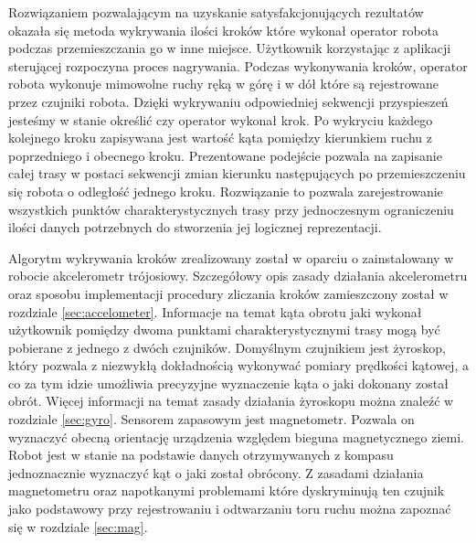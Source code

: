 Rozwiązaniem pozwalającym na uzyskanie satysfakcjonujących rezultatów okazała
się metoda wykrywania ilości kroków które wykonał operator robota podczas 
przemieszczania go w inne miejsce. Użytkownik korzystając z aplikacji
sterującej rozpoczyna proces nagrywania. Podczas wykonywania kroków, operator 
robota wykonuje mimowolne ruchy ręką w górę i w dół które są rejestrowane przez
czujniki robota. Dzięki wykrywaniu odpowiedniej sekwencji przyspieszeń jesteśmy
w stanie określić czy operator wykonał krok. Po wykryciu każdego kolejnego kroku
zapisywana jest wartość kąta pomiędzy kierunkiem ruchu z poprzedniego i obecnego
kroku. Prezentowane podejście pozwala na zapisanie całej trasy w postaci
sekwencji zmian kierunku następujących po przemieszczeniu się robota o odległość
jednego kroku. Rozwiązanie to pozwala zarejestrowanie wszystkich punktów
charakterystycznych trasy przy jednoczesnym ograniczeniu ilości danych
potrzebnych do stworzenia jej logicznej reprezentacji.

Algorytm wykrywania kroków zrealizowany został w oparciu o zainstalowany w
robocie akcelerometr trójosiowy. Szczegółowy opis zasady działania
akcelerometru oraz sposobu implementacji procedury zliczania kroków zamieszczony
został w rozdziale \ref{sec:accelometer}. Informacje na temat kąta obrotu jaki
wykonał użytkownik pomiędzy dwoma punktami charakterystycznymi trasy mogą być pobierane z jednego z dwóch
czujników. Domyślnym czujnikiem jest żyroskop, który pozwala z niezwykłą
dokładnością wykonywać pomiary prędkości kątowej, a co za tym idzie umożliwia
precyzyjne wyznaczenie kąta o jaki dokonany został obrót. Więcej informacji na
temat zasady działania żyroskopu można znaleźć w rozdziale \ref{sec:gyro}.
Sensorem zapasowym jest magnetometr. Pozwala on wyznaczyć obecną orientację 
urządzenia względem bieguna magnetycznego ziemi. Robot jest w stanie na 
podstawie danych otrzymywanych z kompasu jednoznacznie wyznaczyć kąt o jaki 
został obrócony. Z zasadami działania magnetometru oraz
napotkanymi problemami które dyskryminują ten czujnik jako podstawowy przy
rejestrowaniu i odtwarzaniu toru ruchu można zapoznać się w rozdziale
\ref{sec:mag}.

